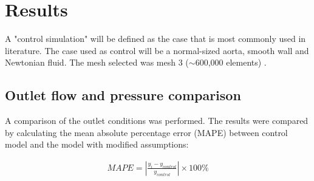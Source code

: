 \chapter{Results}
\label{chapterlabel6}

A "control simulation" will be defined as the case that is most commonly used in literature. The case used as control will be a normal-sized aorta, smooth wall and Newtonian fluid. The mesh selected was mesh 3 ($\sim$600,000 elements) \cite{Steinman2012AssumptionsHemodynamics}.

\section{Outlet flow and pressure comparison}
A comparison of the outlet conditions was performed. The results were compared by calculating the mean absolute percentage error (MAPE) between control model and the model with modified assumptions:

\begin{align}
    MAPE =| \frac{y_{i}-y_{control}}{y_{control}}| \times 100 \%
\end{align}


